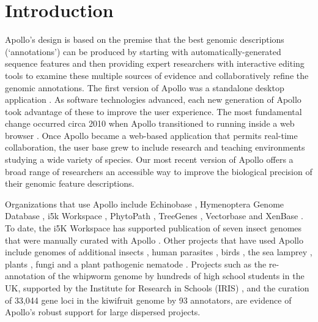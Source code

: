 \section*{Introduction}

Apollo's design is based on the premise that the best genomic
descriptions (`annotations') can be produced by starting with
automatically-generated sequence features and then providing expert
researchers with interactive editing tools to examine these multiple
sources of evidence and collaboratively refine the genomic annotations.
The first version of Apollo was a standalone desktop application
\cite{Lewis_2002}. As software technologies advanced, each new generation of
Apollo took advantage of these to improve the user experience. The most
fundamental change occurred circa 2010 when Apollo transitioned to
running inside a web browser \cite{Lee_2013}. Once Apollo became a web-based
application that permits real-time collaboration, the user base grew to
include research and teaching environments studying a wide variety of
species. Our most recent version of Apollo \cite{zenodo.1295754} offers a broad range
of researchers an accessible way to improve the biological precision of
their genomic feature descriptions.

Organizations that use Apollo include Echinobase \cite{Kudtarkar_2017}, Hymenoptera
Genome Database \cite{Elsik_2015}, i5k Workspace \cite{Poelchau_2014}, PhytoPath \cite{Pedro_2015},
TreeGenes \cite{Neale_2014}, Vectorbase \cite{Giraldo_Calder_n_2014} and XenBase \cite{James_Zorn_2015}. To date, the
i5K Workspace has supported publication of seven insect genomes that
were manually curated with Apollo \cite{Poynton_2018,McKenna_2016,Linnen_2018,Schoville_2018,Papanicolaou_2016,Kanost_2016,Benoit_2016}. Other projects that have
used Apollo include genomes of additional insects \cite{Fu_2018,Gouin_2017,Chen_2015}, human
parasites \cite{Zhu_2017,Ifeonu_2016,Ifeonu_2016_2}, birds \cite{Colquitt_2018,Lee_2018}, the sea lamprey \cite{Smith_2018},
plants \cite{Pilkington_2018,Li_2017,Xu_2016}, fungi \cite{Chen_2016,Frantzeskakis_2018,Jelen_2016,Nemri_2014,Schuelke_2016,Syme_2016} and a plant pathogenic nematode
\cite{Eves_van_den_Akker_2016}. Projects such as the re-annotation of the whipworm genome by
hundreds of high school students in the UK, supported by the Institute
for Research in Schools (IRIS) \cite{GenomeDecodersHumanWhipworm}, and the curation of 33,044 gene
loci in the kiwifruit genome by 93 annotators, are evidence of Apollo's
robust support for large dispersed projects.

